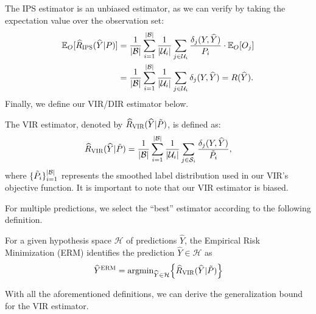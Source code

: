 The IPS estimator is an unbiased estimator, as we can verify by taking the expectation value over the observation set:
%
\begin{align*}
    \mathbb{E}_{O} [\hat{R}_{\textsc{IPS}}(\hat{Y} | P)] &= \dfrac{1}{|\mathcal{B}|} \sum_{i=1}^{|\mathcal{B}|} \dfrac{1}{|\mathcal{U}_{i}|} \sum_{j \in \mathcal{U}_{i}} \dfrac{\delta_{j} (Y, \hat{Y})}{P_{i}} \cdot \mathbb{E}_{O} [O_{j}] \\ &= \dfrac{1}{|\mathcal{B}|} \sum_{i=1}^{|\mathcal{B}|} \dfrac{1}{|\mathcal{U}_{i}|} \sum_{j \in \mathcal{U}_{i}} \delta_{j} (Y, \hat{Y}) = R(\hat{Y}).
\end{align*}
%
{Finally, we define our VIR/DIR estimator below.}
\begin{definition}
The VIR estimator, denoted by $\hat{R}_{\textsc{VIR}}(\hat{Y} | \Tilde{P})$, is defined as:
%
\begin{align}
    \hat{R}_{\textsc{VIR}}(\hat{Y} | \Tilde{P}) = \dfrac{1}{|\mathcal{B}|} \sum_{i=1}^{|\mathcal{B}|} \dfrac{1}{|\mathcal{U}_{i}|} \sum_{j \in \mathcal{S}_{i}} \dfrac{\delta_{j} (Y, \hat{Y})}{\Tilde{P}_{i}}, \label{eq:VIR_estimator}
\end{align}
%
where $\{ \Tilde{P}_{i} \}_{i=1}^{|\mathcal{B}|}$ represents the smoothed label distribution used in our VIR's objective function. It is important to note that our VIR estimator is biased.
\end{definition}
{For multiple predictions, we select the ``best'' estimator according to the following definition.}
\begin{definition} 
For a given hypothesis space $\mathcal{H}$ of predictions $\hat{Y}$, the Empirical Risk Minimization (ERM) identifies the prediction $\hat{Y} \in \mathcal{H}$ as
%
\begin{align*}
    \hat{Y}^{\textsc{ERM}} = \textrm{argmin}_{\hat{Y} \in \mathcal{H}} \Big\{ \hat{R}_{\textsc{VIR}}(\hat{Y} | \Tilde{P}) \Big\}    
\end{align*}
%
\end{definition}

With all the aforementioned definitions, we can derive the generalization bound for the VIR estimator.

